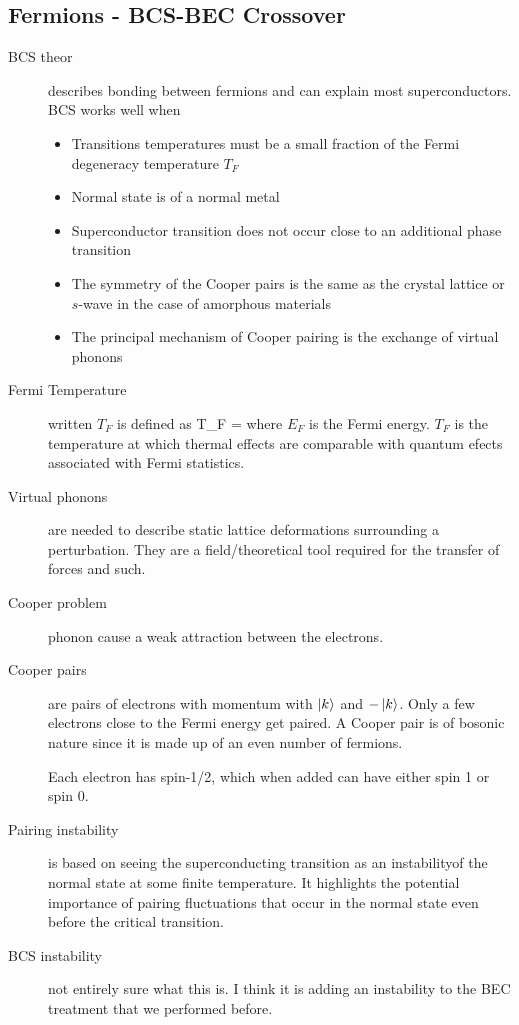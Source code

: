 \subsection{Fermions - BCS-BEC Crossover}
\begin{description}
\item[BCS theor] describes bonding between fermions and can explain most superconductors. BCS works well when
\begin{itemize}
\item Transitions temperatures must be a small fraction of the Fermi degeneracy temperature $T_F$
\item Normal state is of a normal metal 
\item Superconductor transition does not occur close to an additional phase transition 
\item The symmetry of the Cooper pairs is the same as the crystal lattice or $s$-wave in the case of amorphous materials
\item The principal mechanism of Cooper pairing is the exchange of virtual phonons
\end{itemize}

\item[Fermi Temperature] written $T_F$ is defined as
\beq
T_F = 
\eeq
where $E_F$  is the Fermi energy.  $T_F$ is the temperature at which thermal effects are comparable with quantum efects associated with Fermi statistics. 

\item[Virtual phonons] are needed to describe static lattice deformations surrounding a perturbation. They are a field/theoretical tool  required for the transfer of forces and such. 

\item[Cooper problem] phonon cause a weak attraction between the electrons. 

\item[Cooper pairs] are pairs of electrons with momentum with $\left| k \right\rangle$ and $-\left| k \right\rangle$. Only a few electrons close to the Fermi energy get paired. A Cooper pair is of bosonic nature since it is made up of an even number of fermions. 

Each electron has spin-1/2, which when added can have either spin 1 or spin 0. 

\item[Pairing instability] is based on seeing the superconducting transition as an instabilityof the normal state at some finite temperature. It highlights the potential importance of pairing fluctuations that occur in the normal state even before the critical transition. 

\item[BCS instability] not entirely sure what this is. I think it is adding an instability to the BEC treatment that we performed before. 

\end{description}
